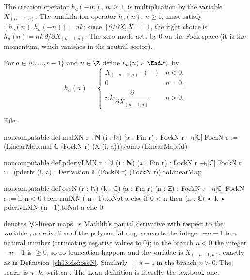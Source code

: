 The creation operator $h_a(-m)$, $m\ge1$, is multiplication by the variable $X_{(m-1,a)}$. The
annihilation operator $h_a(n)$, $n\ge 1$, must satisfy $[h_a(n),h_a(-n)]=nk$; since
$[\partial/\partial X,X]=1$, the right choice is $h_a(n)=nk\,\partial/\partial X_{(n-1,a)}$. The
zero mode acts by $0$ on the Fock space (it is the momentum, which vanishes in the neutral sector).

\begin{definition}[Oscillators]\label{ch03:def:oscN}
For $a\in\{0,\dots,r-1\}$ and $n\in\Z$ define $h_a(n)\in\End\mathcal F_r$ by
\begin{equation*}
  h_a(n)=\begin{cases} X_{(-n-1,a)}\cdot(-) & n<0,\\ 0 & n=0,\\
  n\,k\,\dfrac{\partial}{\partial X_{(n-1,a)}} & n>0.\end{cases}
\end{equation*}
\end{definition}

\noindent File .
\begin{leancode}
noncomputable def mulXN {r : ℕ} (i : ℕ) (a : Fin r) : FockN r →ₗ[ℂ] FockN r :=
  (LinearMap.mul ℂ (FockN r) (X (i, a))).comp (LinearMap.id)

noncomputable def pderivLMN {r : ℕ} (i : ℕ) (a : Fin r) : FockN r →ₗ[ℂ] FockN r :=
  (pderiv (i, a) : Derivation ℂ (FockN r) (FockN r)).toLinearMap

noncomputable def oscN (r : ℕ) (k : ℂ) (a : Fin r) (n : ℤ) : FockN r →ₗ[ℂ] FockN r :=
  if n < 0 then mulXN (-n - 1).toNat a
  else if 0 < n then (n : ℂ) • k • pderivLMN (n - 1).toNat a
  else 0
\end{leancode}

\begin{dictionary}
 denotes $\C$-linear maps.  is Mathlib's partial derivative with
respect to the variable , a derivation of the polynomial ring. 
converts the integer $-n-1$ to a natural number (truncating negative values to $0$); in the branch
$n<0$ the integer $-n-1$ is $\ge 0$, so no truncation happens and the variable is $X_{(-n-1,a)}$,
exactly as in Definition~\ref{ch03:def:oscN}. Similarly  $=n-1$ in the branch
$n>0$. The scalar is $n\cdot k$, written . The Lean definition is
literally the textbook one.
\end{dictionary}

